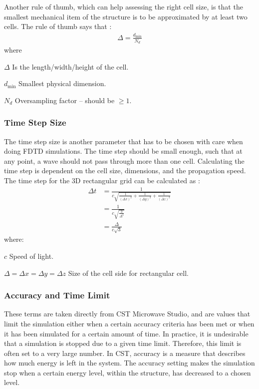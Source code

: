 Another rule of thumb, which can help assessing the right cell size, is that the smallest mechanical item of the structure is to be approximated by at least two cells. The rule of thumb says that \cite{kunz1993fdtd}:
\begin{align}
    \Delta = \frac{d_{\text{min}}}{N_d} 
\end{align}
where 
\begin{where}
\item[$\Delta$] Is the length/width/height of the cell.
\item[$d_{\text{min}}$] Smallest physical dimension.
\item[$N_d$] Oversampling factor -- should be $\geq 1$.
\end{where}

\subsubsection{Time Step Size}
The time step size is another parameter that has to be chosen with care when doing FDTD simulations. The time step should be small enough, such that at any point, a wave should not pass through more than one cell. Calculating the time step is dependent on the cell size, dimensions, and the propagation speed. The time step for the 3D rectangular grid can be calculated as \cite{kunz1993fdtd}:
\begin{align}
   \label{eq:deltat}
   \Delta t &= \frac{1}{c \sqrt{\frac{1}{(\Delta x)^2}+\frac{1}{(\Delta y)^2}+\frac{1}{(\Delta z)^2}}} \\
            &= \frac{1}{c \sqrt{\frac{3}{\Delta^2}}} \\
            &= \frac{\Delta}{c \sqrt{3}}            
\end{align}
where:
\begin{where}
\item [$c$] Speed of light.
\item [$\Delta = \Delta x = \Delta y = \Delta z$] Size of the cell side for rectangular cell.
\end{where}

\subsubsection{Accuracy and Time Limit}
These terms are taken directly from CST Microwave Studio, and are values that limit the simulation either when a certain accuracy criteria has been met or when it has been simulated for a certain amount of time. In practice, it is undesirable that a simulation is stopped due to a given time limit. Therefore, this limit is often set to a very large number. In CST, accuracy is a measure that describes how much energy is left in the system. The accuracy setting makes the simulation stop when a certain energy level, within the structure, has decreased to a chosen level. 

\begin{aautail}
\end{aautail}
